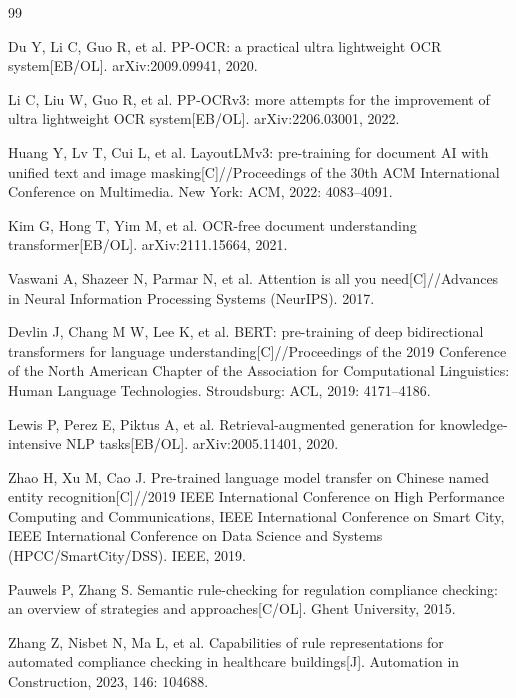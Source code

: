 \documentclass[12pt,a4paper]{ctexart}
\begin{document}
\begin{thebibliography}{99}

Du Y, Li C, Guo R, et al. PP-OCR: a practical ultra lightweight OCR system[EB/OL]. arXiv:2009.09941, 2020.

Li C, Liu W, Guo R, et al. PP-OCRv3: more attempts for the improvement of ultra lightweight OCR system[EB/OL]. arXiv:2206.03001, 2022.

Huang Y, Lv T, Cui L, et al. LayoutLMv3: pre-training for document AI with unified text and image masking[C]//Proceedings of the 30th ACM International Conference on Multimedia. New York: ACM, 2022: 4083--4091.

Kim G, Hong T, Yim M, et al. OCR-free document understanding transformer[EB/OL]. arXiv:2111.15664, 2021.

Vaswani A, Shazeer N, Parmar N, et al. Attention is all you need[C]//Advances in Neural Information Processing Systems (NeurIPS). 2017.

Devlin J, Chang M W, Lee K, et al. BERT: pre-training of deep bidirectional transformers for language understanding[C]//Proceedings of the 2019 Conference of the North American Chapter of the Association for Computational Linguistics: Human Language Technologies. Stroudsburg: ACL, 2019: 4171--4186.

Lewis P, Perez E, Piktus A, et al. Retrieval-augmented generation for knowledge-intensive NLP tasks[EB/OL]. arXiv:2005.11401, 2020.

Zhao H, Xu M, Cao J. Pre-trained language model transfer on Chinese named entity recognition[C]//2019 IEEE International Conference on High Performance Computing and Communications, IEEE International Conference on Smart City, IEEE International Conference on Data Science and Systems (HPCC/SmartCity/DSS). IEEE, 2019.

Pauwels P, Zhang S. Semantic rule-checking for regulation compliance checking: an overview of strategies and approaches[C/OL]. Ghent University, 2015.

Zhang Z, Nisbet N, Ma L, et al. Capabilities of rule representations for automated compliance checking in healthcare buildings[J]. Automation in Construction, 2023, 146: 104688.

\end{thebibliography}
\end{document}
